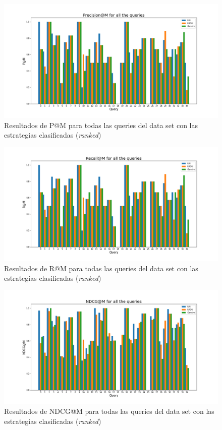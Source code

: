 \begin{figure}[H]
    \centering
    \includegraphics[width=\textwidth]{doc/images/P@M_Ranked.png}
    \caption{Resultados de P@M para todas las queries del data set con las estrategias clasificadas (\textit{ranked})}
    \label{fig:my_label}
\end{figure}

\begin{figure}[H]
    \centering
    \includegraphics[width=\textwidth]{doc/images/R@M_Ranked.png}
    \caption{Resultados de R@M para todas las queries del data set con las estrategias clasificadas (\textit{ranked})}
    \label{fig:my_label}
\end{figure}


\begin{figure}[H]
    \centering
    \includegraphics[width=\textwidth]{doc/images/NDCG@M_Ranked.png}
    \caption{Resultados de NDCG@M para todas las queries del data set con las estrategias clasificadas (\textit{ranked})}
    \label{fig:my_label}
\end{figure}


